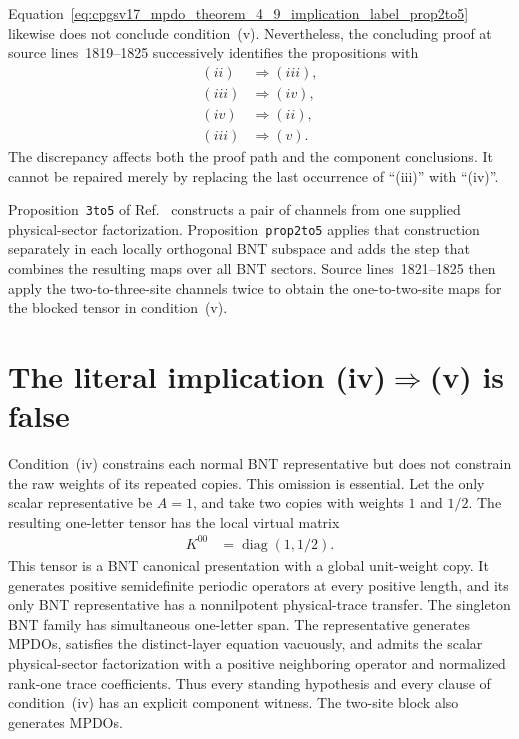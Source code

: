 \documentclass{article}
\begin{document}
Equation~\ref{eq:cpgsv17_mpdo_theorem_4_9_implication_label_prop2to5} likewise
does not conclude condition~(v). Nevertheless, the concluding proof at source
lines~1819--1825 successively identifies the propositions with
\begin{align}
    (ii)&\Longrightarrow(iii),
    \label{eq:cpgsv17_mpdo_theorem_4_9_implication_label_concluding_ii_iii}\\
    (iii)&\Longrightarrow(iv),
    \label{eq:cpgsv17_mpdo_theorem_4_9_implication_label_concluding_iii_iv}\\
    (iv)&\Longrightarrow(ii),
    \label{eq:cpgsv17_mpdo_theorem_4_9_implication_label_concluding_iv_ii}\\
    (iii)&\Longrightarrow(v).
    \label{eq:cpgsv17_mpdo_theorem_4_9_implication_label_concluding_iii_v}
\end{align}
The discrepancy affects both the proof path and the component conclusions. It
cannot be repaired merely by replacing the last occurrence of ``(iii)'' with
``(iv)''.

Proposition~\texttt{3to5} of
Ref.~\cite[lines~1510--1563]{Cirac2016MPDO_arXiv} constructs a pair of
channels from one supplied physical-sector factorization.
Proposition~\texttt{prop2to5} applies that construction separately in each
locally orthogonal BNT subspace and adds the step that combines the resulting
maps over all BNT sectors. Source lines~1821--1825 then apply the
two-to-three-site channels twice to obtain the one-to-two-site maps for the
blocked tensor in condition~(v).

\section{The literal implication (iv)$\Rightarrow$(v) is false}

Condition~(iv) constrains each normal BNT representative but does not constrain
the raw weights of its repeated copies. This omission is essential. Let the
only scalar representative be $A=1$, and take two copies with weights $1$ and
$1/2$. The resulting one-letter tensor has the local virtual matrix
\begin{align}
    K^{00}
        &=\operatorname{diag}(1,1/2).
    \label{eq:cpgsv17_mpdo_theorem_4_9_implication_label_counterexample_tensor}
\end{align}
This tensor is a BNT canonical presentation with a global unit-weight copy. It
generates positive semidefinite periodic operators at every positive length,
and its only BNT representative has a nonnilpotent physical-trace transfer.
The singleton BNT family has simultaneous one-letter span. The representative
generates MPDOs, satisfies the distinct-layer equation vacuously, and admits
the scalar physical-sector factorization with a positive neighboring operator
and normalized rank-one trace coefficients. Thus every standing hypothesis
and every clause of condition~(iv) has an explicit component witness. The
two-site block also generates MPDOs.
\end{document}
